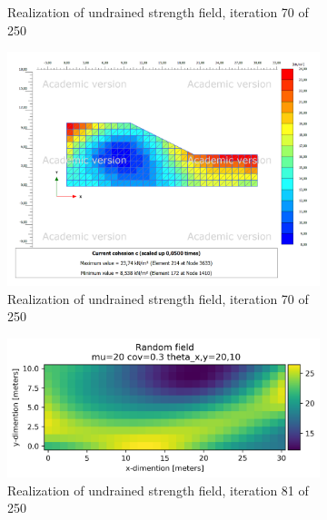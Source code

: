 \begin{figure}
\begin{subfigure}{0.475\textwidth}
    \caption[]%
    {{\small Realization of undrained strength field, iteration 70 of 250}}
    \label{fig:mean and std of net34}
\end{subfigure}
\hfill
\begin{subfigure}{0.475\textwidth}
    \centering
    \includegraphics[width=\textwidth]{fig/ss/testp20211118-125818}
    \caption[]%
    {{\small Realization of undrained strength field, iteration 70 of 250}}
    \label{fig:mean and std of net44}
\end{subfigure}
\begin{subfigure}{0.475\textwidth}
    \centering
    \includegraphics[width=\textwidth]{fig/ss/test20211118-125941}
    \caption[]%
    {{\small Realization of undrained strength field, iteration 81 of 250}}
    \label{fig:mean and std of net56}
\end{subfigure}
\hfill
\begin{subfigure}{0.475\textwidth}
    \centering

\end{subfigure}
\end{figure}
